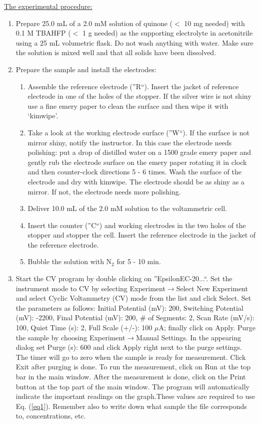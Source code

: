 \documentclass[byrevtex,amssymb,aps,pra,floatfix,letterpaper]{revtex4}
\begin{document}
\underline{The experimental procedure:}\\

\begin{enumerate}

\item Prepare 25.0 mL of a 2.0 mM solution of quinone ($<$ 10 mg needed) with 0.1 M TBAHFP ($<$ 1 g needed) as the supporting electrolyte in acetonitrile using a 25 mL volumetric flask. Do not wash anything with water. Make sure the solution is mixed well and that all solids have been dissolved.

\item Prepare the sample and install the electrodes:
\begin{enumerate}
\item Assemble the reference electrode (''R``). Insert the jacket of reference electrode in one of the holes of the stopper. If the silver wire is not shiny use a fine emery paper to clean the surface and then wipe it with ‘kimwipe'.
\item Take a look at the working electrode surface (''W``). If the surface is not mirror shiny, notify the instructor. In this case the electrode needs polishing: put a drop of distilled water on a 1500 grade emery paper and gently rub the electrode surface on the emery paper rotating it in clock and then counter-clock directions 5 - 6 times. Wash the surface of the electrode and dry with kimwipe. The electrode should be as shiny as a mirror. If not, the electrode needs more polishing.
\item Deliver 10.0 mL of the 2.0 mM solution to the voltammetric cell.
\item Insert the counter (''C``) and working electrodes in the two holes of the stopper and stopper the cell. Insert the reference electrode in the jacket of the reference electrode.
\item Bubble the solution with N$_2$ for 5 - 10 min.
\end{enumerate}

\item Start the CV program by double clicking on ''EpsilonEC-20...``. Set the instrument mode to CV by selecting Experiment$\rightarrow$Select New Experiment and select Cyclic Voltammetry (CV) mode from the list and click Select. Set the parameters as follows: Initial Potential (mV): 200, Switching Potential (mV): -2200, Final Potential (mV):
200, \# of Segments: 2, Scan Rate (mV/s): 100, Quiet Time (s): 2, Full Scale (+/-): 100 $\mu$A; finally click on Apply. Purge the sample by choosing Experiment$\rightarrow$Manual Settings. In the appearing dialog set Purge (s): 600 and click Apply right next to the purge settings. The timer will go to zero when the sample is ready for measurement. Click Exit after purging is done. To run the measurement, click on Run at the top bar in the main window. After the measurement is done, click on the Print button at the top part of the main window. The program will automatically indicate the important readings on the graph.These values are required to use Eq. (\ref{eq1}). Remember also to write down what sample the file corresponds to, concentrations, etc.


\end{enumerate}
\end{document}
